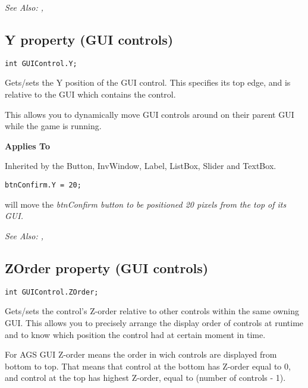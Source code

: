 \it{See Also:} ,


\subsection{Y property (GUI controls)}\label{GUIControl.Y}%

\begin{verbatim}
int GUIControl.Y;
\end{verbatim}
Gets/sets the Y position of the GUI control. This specifies its top edge, and is
relative to the GUI which contains the control.

This allows you to dynamically move GUI controls around on their parent GUI while the
game is running.

\bf{Applies To}

Inherited by the Button, InvWindow, Label, ListBox, Slider and TextBox.

\begin{verbatim}
btnConfirm.Y = 20;
\end{verbatim}
will move the \it{btnConfirm} button to be positioned 20 pixels from the top of its GUI.

\it{See Also:} ,


\subsection{ZOrder property (GUI controls)}\label{GUIControl.ZOrder}%

\begin{verbatim}
int GUIControl.ZOrder;
\end{verbatim}
Gets/sets the control's Z-order relative to other controls within the same owning GUI.
This allows you to precisely arrange the display order of controls at runtime and to
know which position the control had at certain moment in time.

For AGS GUI Z-order means the order in wich controls are displayed from bottom to top.
That means that control at the bottom has Z-order equal to 0, and control at the top
has highest Z-order, equal to (number of controls - 1).

